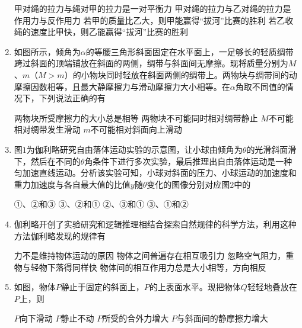 \begin{enumerate}[leftmargin=0em]
\fourchoices
{甲对绳的拉力与绳对甲的拉力是一对平衡力}
{甲对绳的拉力与乙对绳的拉力是作用力与反作用力}
{若甲的质量比乙大，则甲能赢得“拔河”比赛的胜利}
{若乙收绳的速度比甲快，则乙能赢得“拔河”比赛的胜利}

\item 
{}
如图所示，倾角为$ \alpha $的等腰三角形斜面固定在水平面上，一足够长的轻质绸带跨过斜面的顶端铺放在斜面的两侧，绸带与斜面间无摩擦。现将质量分别为$ M $、$ m $（$ M>m $）的小物块同时轻放在斜面两侧的绸带上。两物块与绸带间的动摩擦因数相等，且最大静摩擦力与滑动摩擦力大小相等。在$ \alpha $角取不同值的情况下，下列说法正确的有  
\begin{figure}[h!]
\centering

\end{figure}


\fourchoices
{两物块所受摩擦力的大小总是相等}
{两物块不可能同时相对绸带静止}
{$ M $不可能相对绸带发生滑动}
{$ m $不可能相对斜面向上滑动}

\item 
{}
图$ 1 $为伽利略研究自由落体运动实验的示意图，让小球由倾角为$ \theta $的光滑斜面滑下，然后在不同的$ \theta $角条件下进行多次实验，最后推理出自由落体运动是一种匀加速直线运动。分析该实验可知，小球对斜面的压力、小球运动的加速度和重力加速度与各自最大值的比值$ y $随$ \theta $变化的图像分别对应图$ 2 $中的  
\begin{figure}[h!]
\centering

\end{figure}


\fourchoices
{①、②和③ }
{③、②和①}
{②、③和① }
{③、①和②}

\item 
{}
伽利略开创了实验研究和逻辑推理相结合探索自然规律的科学方法，利用这种方法伽利略发现的规律有  


\fourchoices
{力不是维持物体运动的原因}
{物体之间普遍存在相互吸引力}
{忽略空气阻力，重物与轻物下落得同样快}
{物体间的相互作用力总是大小相等，方向相反}


\item 
{}
如图，物体$ P $静止于固定的斜面上，$ P $的上表面水平。现把物体$ Q $轻轻地叠放在$ P $上，则  
\begin{figure}[h!]
\centering

\end{figure}


\fourchoices
{$ P $向下滑动}
{$ P $静止不动}
{$ P $所受的合外力增大}
{$ P $与斜面间的静摩擦力增大}



\end{enumerate}
